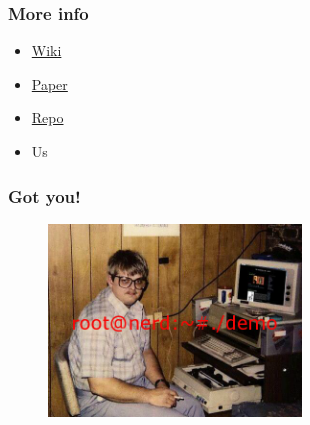 \documentclass[usepdftitle=false,13pt]{beamer}
\begin{document}
\begin{frame}\frametitle{More info}

	\begin{itemize}
		\item {\color{blue} \href{http://wiki.confine-project.eu/wibed:start}{Wiki}}
		\item {\color{blue} \href{http://wiki.confine-project.eu/_media/wibed:wibed-7pages.pdf}{Paper}}
		\item {\color{blue} \href{http://redmine.confine-project.eu/projects/wibed}{Repo}}
		\item Us 
	\end{itemize}

\end{frame}

\begin{frame}\frametitle{Got you!}

	\begin{figure}[h!]
	\begin{center}
	\includegraphics[width=0.6\textwidth]{pic/nerd}
	\label{fig:sdn}
	\end{center}
	\end{figure}

\end{frame}
\end{document}
